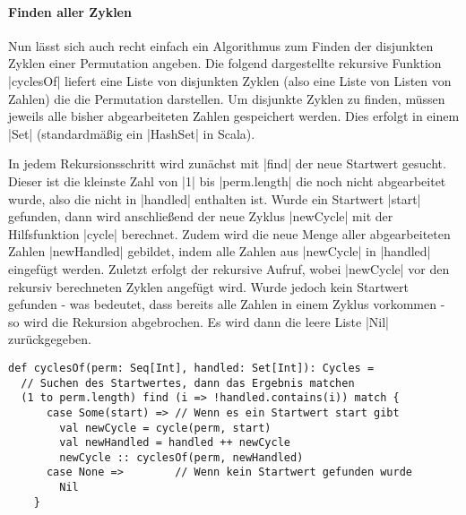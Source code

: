 \paragraph{Finden aller Zyklen}
Nun lässt sich auch recht einfach ein Algorithmus zum Finden der disjunkten Zyklen einer Permutation angeben.
Die folgend dargestellte rekursive Funktion |cyclesOf| liefert eine Liste von disjunkten Zyklen (also eine Liste von Listen von Zahlen)
die die Permutation darstellen. Um disjunkte Zyklen zu finden, müssen jeweils alle bisher abgearbeiteten Zahlen gespeichert werden.
Dies erfolgt in einem |Set| (standardmäßig ein |HashSet| in Scala).

In jedem Rekursionsschritt wird zunächst mit |find| der neue Startwert gesucht.
Dieser ist die kleinste Zahl von |1| bis |perm.length| die noch nicht abgearbeitet wurde, also die nicht in |handled| enthalten ist.
Wurde ein Startwert |start| gefunden, dann wird anschließend der neue Zyklus |newCycle| mit der Hilfsfunktion |cycle| berechnet.
Zudem wird die neue Menge aller abgearbeiteten Zahlen |newHandled| gebildet, indem alle Zahlen aus |newCycle| in |handled| eingefügt werden.
Zuletzt erfolgt der rekursive Aufruf, wobei |newCycle| vor den rekursiv berechneten Zyklen angefügt wird.
Wurde jedoch kein Startwert gefunden - was bedeutet, dass bereits alle Zahlen in einem Zyklus vorkommen - so wird die Rekursion abgebrochen.
Es wird dann die leere Liste |Nil| zurückgegeben.
\lstset{language=Scala}
\lstset{basicstyle=\ttfamily}
\begin{lstlisting}
def cyclesOf(perm: Seq[Int], handled: Set[Int]): Cycles =
  // Suchen des Startwertes, dann das Ergebnis matchen
  (1 to perm.length) find (i => !handled.contains(i)) match {
      case Some(start) => // Wenn es ein Startwert start gibt
        val newCycle = cycle(perm, start)
        val newHandled = handled ++ newCycle
        newCycle :: cyclesOf(perm, newHandled)
      case None =>        // Wenn kein Startwert gefunden wurde
        Nil
    }
\end{lstlisting}
